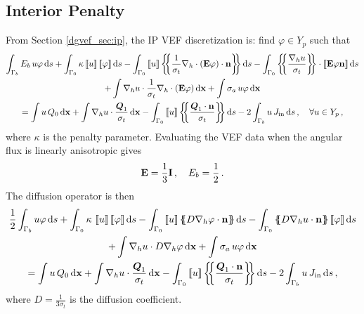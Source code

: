 \documentclass[../doc.tex]{subfiles}
\begin{document}
\subsection{Interior Penalty}
From Section \ref{dgvef_sec:ip}, the IP VEF discretization is: find $\varphi\in Y_p$ such that 
	\begin{multline} \label{smm:ipvef}
		\int_{\Gamma_b} E_b\, u \varphi \ud s + \int_{\Gamma_0} \kappa \jump{u} \jump{\varphi} \ud s - \int_{\Gamma_0} \jump{u} \avg{\frac{1}{\sigma_t}\nablah\cdot\paren{\E\varphi}\cdot\n} \ud s - \int_{\Gamma_0} \avg{\frac{\nablah u}{\sigma_t}} \cdot \jump{\E\varphi\n} \ud s \\
		+ \int \nablah u \cdot \frac{1}{\sigma_t}\nablah\cdot\paren{\E\varphi} \ud \x + \int \sigma_a\, u \varphi \ud \x \\ 
		= \int u\, Q_0 \ud \x + \int \nablah u \cdot \frac{\vec{Q}_1}{\sigma_t} \ud \x - \int_{\Gamma_0} \jump{u} \avg{\frac{\vec{Q}_1\cdot\n}{\sigma_t}} \ud s - 2\int_{\Gamma_b} u\, \Jin \ud s \,, \quad \forall u \in Y_p \,, 
	\end{multline}
where $\kappa$ is the penalty parameter. Evaluating the VEF data when the angular flux is linearly anisotropic gives
	\begin{equation}
		\boldsymbol{\mathrm{E}} = \frac{1}{3}\boldsymbol{\mathrm{I}} \,, \quad E_b = \frac{1}{2} \,. 
	\end{equation}
The diffusion operator is then 
	\begin{multline}
		\frac{1}{2}\int_{\Gamma_b} u\varphi \ud s + \int_{\Gamma_0} \kappa\, \jump{u}\jump{\varphi} \ud s - \int_{\Gamma_0} \jump{u}\avg{D\nablah\varphi\cdot\n} \ud s - \int_{\Gamma_0} \avg{D\nablah u\cdot\n} \jump{\varphi} \ud s \\
		+ \int \nablah u \cdot D\nablah\varphi \ud \x + \int \sigma_a\, u \varphi \ud \x \\
		= \int u\, Q_0 \ud \x + \int \nablah u \cdot \frac{\vec{Q}_1}{\sigma_t} \ud \x - \int_{\Gamma_0} \jump{u} \avg{\frac{\vec{Q}_1\cdot\n}{\sigma_t}} \ud s - 2\int_{\Gamma_b} u\, \Jin \ud s \,,
	\end{multline}
where $D = \frac{1}{3\sigma_t}$ is the diffusion coefficient. 
\end{document}

